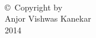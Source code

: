 
\thispagestyle{empty}
\hbox{\ }

\vfill
\renewcommand{\baselinestretch}{1}
\small\normalsize

\vspace{-.65in}

\begin{center}
\large{\copyright \hbox{ }Copyright by\\
Anjor Vishwas Kanekar  %
\\
2014}
\end{center}

\vfill
